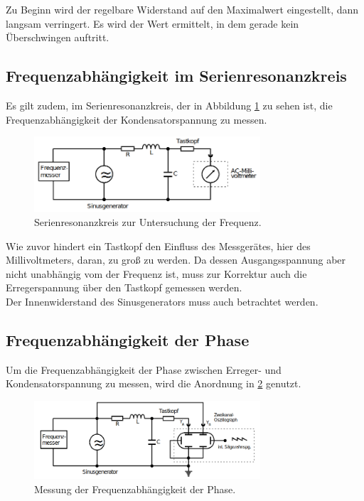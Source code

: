     \noindent Zu Beginn wird der regelbare Widerstand auf den Maximalwert eingestellt,
    dann langsam verringert. Es wird der Wert ermittelt, in dem gerade kein 
    Überschwingen auftritt.

\subsection{Frequenzabhängigkeit im Serienresonanzkreis}
    Es gilt zudem, im Serienresonanzkreis, der in Abbildung \ref{fig:5c} zu
    sehen ist, die Frequenzabhängigkeit der Kondensatorspannung zu messen.

    \begin{figure}
        \centering
        \includegraphics[width=0.75\textwidth]{5c.png}
        \caption{Serienresonanzkreis zur Untersuchung der Frequenz.\cite{anleitung}}
        \label{fig:5c}
    \end{figure}

    \noindent Wie zuvor hindert ein Tastkopf den Einfluss des Messgerätes, hier des Millivoltmeters, daran,
    zu groß zu werden. Da dessen Ausgangsspannung aber nicht unabhängig 
    vom der Frequenz ist, muss zur Korrektur auch die Erregerspannung über
    den Tastkopf gemessen werden. \\
    Der Innenwiderstand des Sinusgenerators muss auch betrachtet werden.

\subsection{Frequenzabhängigkeit der Phase}
    Um die Frequenzabhängigkeit der Phase zwischen Erreger- und
    Kondensatorspannung zu messen, wird die Anordnung in 
    \ref{fig:5d} genutzt.

    \begin{figure}
        \centering
        \includegraphics[width=0.75\textwidth]{5d.png}
        \caption{Messung der Frequenzabhängigkeit der Phase.\cite{anleitung}}
        \label{fig:5d}
    \end{figure}

